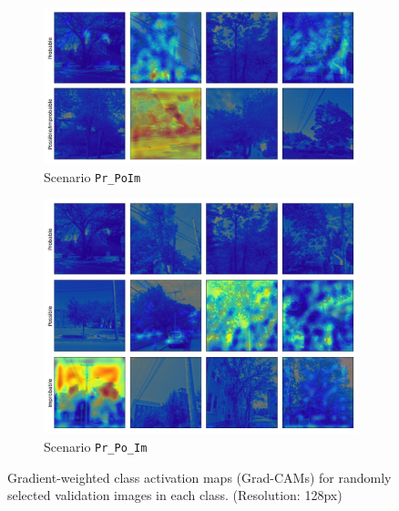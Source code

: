 \documentclass[Journal,letterpaper, SingleSpace, InsideFigs]{ascelike-new}
\begin{document}
\begin{figure}[ht]
    \begin{subfigure}[t]{.45\linewidth}
    \centering
    \includegraphics[width=\linewidth]{opt-gradcam-Pr_PoIm-128-px-4-images.png}
    \caption{Scenario \texttt{Pr\_PoIm}}
    \label{prpo_im_cm}
    \end{subfigure}%
    \begin{subfigure}[t]{.45\linewidth}
    \centering
    \includegraphics[width=\linewidth]{opt-gradcam-Pr_Po_Im-128-px-4-images.png}
    \caption{Scenario \texttt{Pr\_Po\_Im}}
    \label{prpo_im_cm}
    \end{subfigure}%
    
    \caption{Gradient-weighted class activation maps (Grad-CAMs) for randomly selected validation images in each class. (Resolution: 128px)}
    \label{fig:my_label}
\end{figure}

\end{document}
